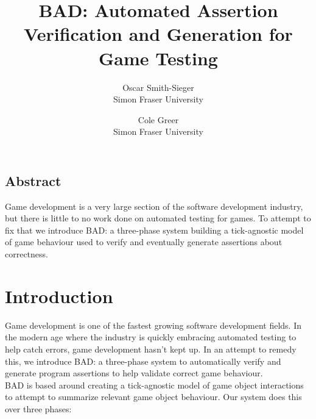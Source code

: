 \documentclass[letterpaper,twocolumn,10pt]{article}
\begin{document}
\date{}

\title{\Large \bf BAD: Automated Assertion Verification and Generation for Game Testing}

\author{
{\rm Oscar Smith-Sieger}\\
Simon Fraser University
\and
{\rm Cole Greer}\\
Simon Fraser University
} %

\maketitle

\thispagestyle{empty}


\subsection*{Abstract}

Game development is a very large section of the software development industry, but there is little to no work done on automated testing for games. To attempt to fix that we introduce BAD: a three-phase system building a tick-agnostic model of game behaviour used to verify and eventually generate assertions about correctness. \\

\section{Introduction}


Game development is one of the fastest growing software development fields. In the modern age where the industry is quickly embracing automated testing to help catch errors, game development hasn't kept up. In an attempt to remedy this, we introduce BAD: a three-phase system to automatically verify and generate program assertions to help validate correct game behaviour.\\

BAD is based around creating a tick-agnostic model of game object interactions to attempt to summarize relevant game object behaviour. Our system does this over three phases:
\end{document}
